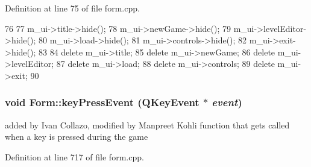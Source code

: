 Definition at line 75 of file form.cpp.


\begin{DoxyCode}
76 {
77     m_ui->title->hide();
78     m_ui->newGame->hide();
79     m_ui->levelEditor->hide();
80     m_ui->load->hide();
81     m_ui->controls->hide();
82     m_ui->exit->hide();
83 
84     delete m_ui->title;
85     delete m_ui->newGame;
86     delete m_ui->levelEditor;
87     delete m_ui->load;
88     delete m_ui->controls;
89     delete m_ui->exit;
90 }
\end{DoxyCode}
\hypertarget{class_form_a51af7e40b48b232f7b3a61f2242aa205}{
\subsubsection[{keyPressEvent}]{\setlength{\rightskip}{0pt plus 5cm}void Form::keyPressEvent (QKeyEvent $\ast$ {\em event})}}
\label{class_form_a51af7e40b48b232f7b3a61f2242aa205}
added by Ivan Collazo, modified by Manpreet Kohli function that gets called when a key is pressed during the game 

Definition at line 717 of file form.cpp.


